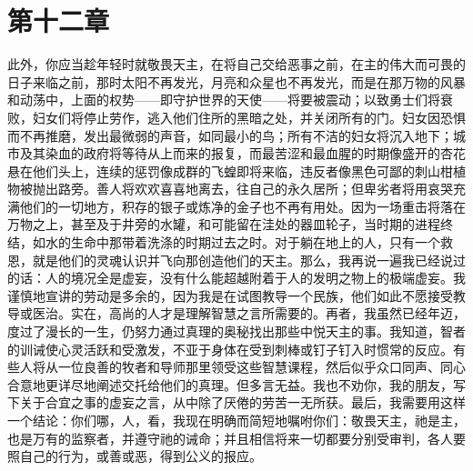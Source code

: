 
\section{第十二章}

此外，你应当趁年轻时就敬畏天主，在将自己交给恶事之前，在主的伟大而可畏的日子来临之前，那时太阳不再发光，月亮和众星也不再发光，而是在那万物的风暴和动荡中，上面的权势——即守护世界的天使——将要被震动；以致勇士们将衰败，妇女们将停止劳作，逃入他们住所的黑暗之处，并关闭所有的门。妇女因恐惧而不再推磨，发出最微弱的声音，如同最小的鸟；所有不洁的妇女将沉入地下；城市及其染血的政府将等待从上而来的报复，而最苦涩和最血腥的时期像盛开的杏花悬在他们头上，连续的惩罚像成群的飞蝗即将来临，违反者像黑色可鄙的刺山柑植物被抛出路旁。善人将欢欢喜喜地离去，往自己的永久居所；但卑劣者将用哀哭充满他们的一切地方，积存的银子或炼净的金子也不再有用处。因为一场重击将落在万物之上，甚至及于井旁的水罐，和可能留在洼处的器皿轮子，当时期的进程终结，如水的生命中那带着洗涤的时期过去之时。对于躺在地上的人，只有一个救恩，就是他们的灵魂认识并飞向那创造他们的天主。那么，我再说一遍我已经说过的话：人的境况全是虚妄，没有什么能超越附着于人的发明之物上的极端虚妄。我谨慎地宣讲的劳动是多余的，因为我是在试图教导一个民族，他们如此不愿接受教导或医治。实在，高尚的人才是理解智慧之言所需要的。再者，我虽然已经年迈，度过了漫长的一生，仍努力通过真理的奥秘找出那些中悦天主的事。我知道，智者的训诫使心灵活跃和受激发，不亚于身体在受到刺棒或钉子钉入时惯常的反应。有些人将从一位良善的牧者和导师那里领受这些智慧课程，然后似乎众口同声、同心合意地更详尽地阐述交托给他们的真理。但多言无益。我也不劝你，我的朋友，写下关于合宜之事的虚妄之言，从中除了厌倦的劳苦一无所获。最后，我需要用这样一个结论：你们哪，人，看，我现在明确而简短地嘱咐你们：敬畏天主，祂是主，也是万有的监察者，并遵守祂的诫命；并且相信将来一切都要分别受审判，各人要照自己的行为，或善或恶，得到公义的报应。\par

